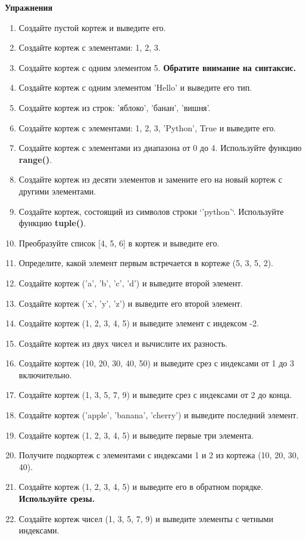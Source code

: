 \documentclass[a4,12pt]{article}
\theoremstyle{remark}
\begin{document}
\textbf{Упражнения}
\begin{enumerate}
    \item Создайте пустой кортеж и выведите его.
    \item Создайте кортеж с элементами: 1, 2, 3.
    \item Создайте кортеж с одним элементом 5. \textbf{Обратите внимание на синтаксис.}
    \item Создайте кортеж с одним элементом 'Hello' и выведите его тип.
    \item Создайте кортеж из строк: 'яблоко', 'банан', 'вишня'.
    \item Создайте кортеж с элементами: 1, 2, 3, 'Python', True и выведите его.
    \item Создайте кортеж с элементами из диапазона от 0 до 4. Используйте функцию \textbf{range()}.
    \item Создайте кортеж из десяти элементов и замените его на новый кортеж с другими элементами.
    \item Создайте кортеж, состоящий из символов строки `'python'`. Используйте функцию \textbf{tuple()}.
    \item Преобразуйте список [4, 5, 6] в кортеж и выведите его.
    \item Определите, какой элемент первым встречается в кортеже (5, 3, 5, 2).
    \item Создайте кортеж ('a', 'b', 'c', 'd') и выведите второй элемент.
    \item Создайте кортеж ('x', 'y', 'z') и выведите его второй элемент.
    \item Создайте кортеж (1, 2, 3, 4, 5) и выведите элемент с индексом -2.
    \item Создайте кортеж из двух чисел и вычислите их разность.
    \item Создайте кортеж (10, 20, 30, 40, 50) и выведите срез с индексами от 1 до 3 включительно.
    \item Создайте кортеж (1, 3, 5, 7, 9) и выведите срез с индексами от 2 до конца.
    \item Создайте кортеж ('apple', 'banana', 'cherry') и выведите последний элемент.
    \item Создайте кортеж (1, 2, 3, 4, 5) и выведите первые три элемента.
    \item Получите подкортеж с элементами с индексами 1 и 2 из кортежа (10, 20, 30, 40).
    \item Создайте кортеж (1, 2, 3, 4, 5) и выведите его в обратном порядке. \textbf{Используйте срезы.}
    \item Создайте кортеж чисел (1, 3, 5, 7, 9) и выведите элементы с четными индексами.

\end{enumerate}
\end{document}

